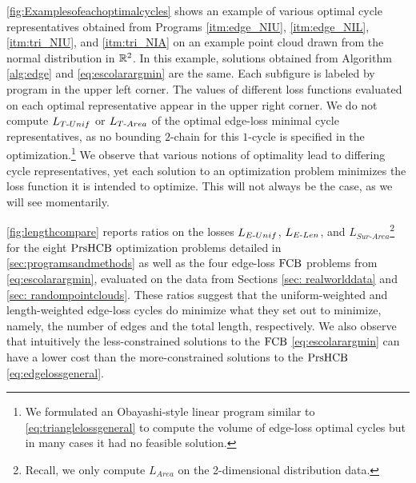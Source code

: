 \fig \ref{fig:Examplesofeachoptimalcycles} shows an example of various optimal cycle representatives obtained from Programs
\ref{itm:edge_NIU},
\ref{itm:edge_NIL},
\ref{itm:tri_NIU}, and
\ref{itm:tri_NIA}
on an example point cloud drawn from the normal distribution in $\mathbb{R}^2$. In this example, solutions obtained from Algorithm \ref{alg:edge} and \pr \eqref{eq:escolarargmin} are the same. Each subfigure is labeled by program in the upper left corner. The values of different loss functions evaluated on each optimal representative appear in the upper right corner.  
We do not compute $L_{T\text{-}Unif}$ or $L_{T\text{-}Area}$ of the optimal edge-loss minimal cycle representatives, as no bounding $2$-chain for this $1$-cycle is specified in the optimization.\footnote{We formulated an Obayashi-style linear program similar to \pr \eqref{eq:trianglelossgeneral} to compute the volume of edge-loss optimal cycles but in many cases it had no feasible solution.} We observe that various notions of optimality lead to differing cycle representatives, yet each solution to an optimization problem minimizes the loss function it is intended to optimize. This will not always be the case, as we will see momentarily.

\fig\ref{fig:lengthcompare} reports ratios on the losses $L_{E\text{-}Unif}$, $L_{E\text{-}Len}$, and $L_{Sur\text{-}Area}$\footnote{Recall, we only compute $L_{Area}$ on the 2-dimensional distribution data.} for the eight $\mathrm{PrsHCB}$ optimization problems detailed in \se \ref{sec:programsandmethods} as well as the four edge-loss $\mathrm{FCB}$ problems from \pr \eqref{eq:escolarargmin}, evaluated on the data from Sections \ref{sec: realworlddata} and \ref{sec: randompointclouds}. 
These ratios suggest that the uniform-weighted and length-weighted edge-loss cycles do minimize what they set out to minimize, namely, the number of edges and the total length, respectively. We also observe that intuitively the less-constrained solutions to the $\mathrm{FCB}$ \pr \eqref{eq:escolarargmin} can have a lower cost than the more-constrained solutions to the $\mathrm{PrsHCB}$ \pr \eqref{eq:edgelossgeneral}. 
 
